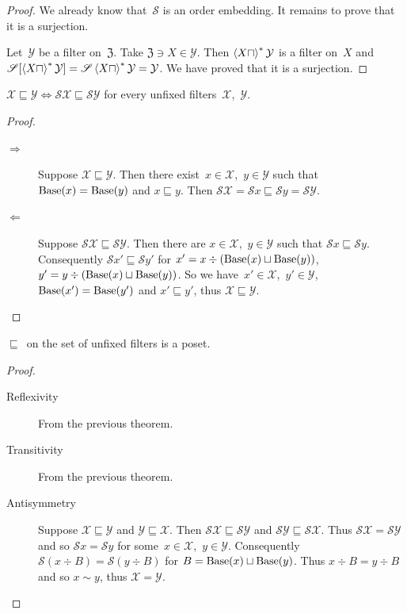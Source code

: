 \begin{proof}
We already know that~$\mathscr{S}$ is an order embedding.
It remains to prove that it is a surjection.

Let~$\mathcal{Y}$ be a filter on~$\mathfrak{Z}$.
Take $\mathfrak{Z}\ni X\in\mathcal{Y}$. Then
$\left\langle X\sqcap\right\rangle ^{\ast}\mathcal{Y}$ is a filter on~$X$ and
$\mathscr{S}[\left\langle X\sqcap\right\rangle ^{\ast}\mathcal{Y}]=\mathscr{S}\left\langle X\sqcap\right\rangle ^{\ast}\mathcal{Y}=\mathcal{Y}$. We have proved that
it is a surjection.
\end{proof}

\begin{lem}
$\mathcal{X}\sqsubseteq\mathcal{Y} \Leftrightarrow
\mathscr{S}\mathcal{X}\sqsubseteq\mathscr{S}\mathcal{Y}$
for every unfixed filters~$\mathcal{X}$,~$\mathcal{Y}$.
\end{lem}

\begin{proof}
~
\begin{description}
\item[$\Rightarrow$] Suppose
$\mathcal{X}\sqsubseteq\mathcal{Y}$. Then there
exist~$x\in\mathcal{X}$,~$y\in\mathcal{Y}$ such that
$\operatorname{Base}(x)=\operatorname{Base}(y)$ and $x\sqsubseteq y$. Then
$\mathscr{S}\mathcal{X} =
\mathscr{S}x \sqsubseteq \mathscr{S}y =
\mathscr{S}\mathcal{Y}$.

\item[$\Leftarrow$] Suppose
$\mathscr{S}\mathcal{X}\sqsubseteq\mathscr{S}\mathcal{Y}$.
Then there are $x\in\mathcal{X}$,~$y\in\mathcal{Y}$
such that $\mathscr{S}x\sqsubseteq\mathscr{S}y$.
Consequently
$\mathscr{S}x' \sqsubseteq\mathscr{S}y'$ for
$x'=x\div(\operatorname{Base}(x)\sqcup\operatorname{Base}(y))$,
$y'=y\div(\operatorname{Base}(x)\sqcup\operatorname{Base}(y))$.
So we have~$x'\in\mathcal{X}$,~$y'\in\mathcal{Y}$,
$\operatorname{Base}(x')=\operatorname{Base}(y')$ and $x'\sqsubseteq y'$,
thus $\mathcal{X}\sqsubseteq\mathcal{Y}$.
\end{description}
\end{proof}

\begin{thm}
$\sqsubseteq$~on the set of unfixed filters is a poset.
\end{thm}

\begin{proof}
~
\begin{description}
\item[Reflexivity] From the previous theorem.

\item[Transitivity] From the previous theorem.

\item[Antisymmetry] Suppose
$\mathcal{X}\sqsubseteq\mathcal{Y}$ and
$\mathcal{Y}\sqsubseteq\mathcal{X}$. Then
$\mathscr{S}\mathcal{X}\sqsubseteq\mathscr{S}\mathcal{Y}$ and
$\mathscr{S}\mathcal{Y}\sqsubseteq\mathscr{S}\mathcal{X}$.
Thus $\mathscr{S}\mathcal{X}=\mathscr{S}\mathcal{Y}$ and
so $\mathscr{S}x=\mathscr{S}y$ for
some~$x\in\mathcal{X}$,~$y\in\mathcal{Y}$. Consequently
$\mathscr{S}(x\div B)=\mathscr{S}(y\div B)$ for
$B=\operatorname{Base}(x)\sqcup\operatorname{Base}(y)$. Thus $x\div B=y\div B$
and so $x\sim y$, thus $\mathcal{X}=\mathcal{Y}$.
\end{description}
\end{proof}

